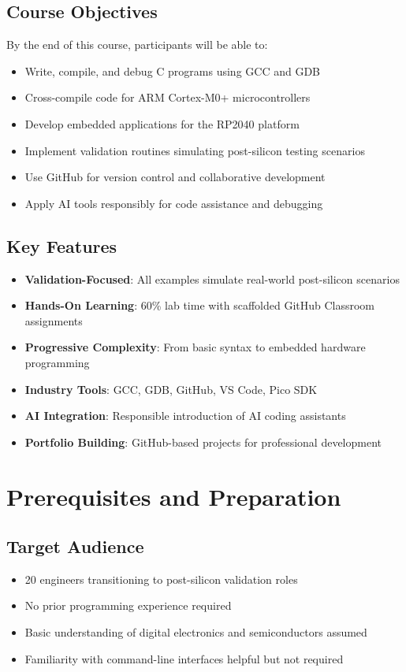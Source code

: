 \documentclass[11pt,a4paper]{article}
\begin{document}
\subsection{Course Objectives}
By the end of this course, participants will be able to:
\begin{itemize}
    \item Write, compile, and debug C programs using GCC and GDB
    \item Cross-compile code for ARM Cortex-M0+ microcontrollers
    \item Develop embedded applications for the RP2040 platform
    \item Implement validation routines simulating post-silicon testing scenarios
    \item Use GitHub for version control and collaborative development
    \item Apply AI tools responsibly for code assistance and debugging
\end{itemize}

\subsection{Key Features}
\begin{itemize}
    \item \textbf{Validation-Focused}: All examples simulate real-world post-silicon scenarios
    \item \textbf{Hands-On Learning}: 60\% lab time with scaffolded GitHub Classroom assignments
    \item \textbf{Progressive Complexity}: From basic syntax to embedded hardware programming
    \item \textbf{Industry Tools}: GCC, GDB, GitHub, VS Code, Pico SDK
    \item \textbf{AI Integration}: Responsible introduction of AI coding assistants
    \item \textbf{Portfolio Building}: GitHub-based projects for professional development
\end{itemize}

\section{Prerequisites and Preparation}

\subsection{Target Audience}
\begin{itemize}
    \item 20 engineers transitioning to post-silicon validation roles
    \item No prior programming experience required
    \item Basic understanding of digital electronics and semiconductors assumed
    \item Familiarity with command-line interfaces helpful but not required
\end{itemize}
\end{document}
